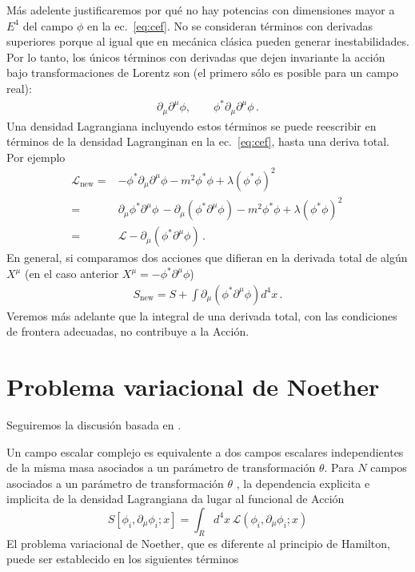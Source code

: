 Más adelente justificaremos por qué no hay potencias con dimensiones mayor a $E^{4}$ del campo $\phi$ en la ec.~\eqref{eq:cef}. No se consideran términos con derivadas superiores porque al igual que en mecánica clásica pueden generar inestabilidades. Por lo tanto, los únicos términos con derivadas que dejen invariante la acción bajo transformaciones de Lorentz son (el primero sólo es posible para un campo real):
\begin{align}
  \partial_{\mu}\partial^{\mu}\phi,\qquad \phi^{*}\partial_{\mu}\partial^{\mu}\phi\,.
\end{align}
Una densidad Lagrangiana incluyendo estos términos se puede reescribir en términos de la densidad Lagranginan en la ec.~\eqref{eq:cef}, hasta una deriva total. Por ejemplo
\begin{align}
  \mathcal{L}_{\text{new}}=&-\phi^{*}\partial_{\mu}\partial^{\mu}\phi-m^2\phi^{*}\phi+\lambda \left(\phi^{*}\phi \right)^2\,\nonumber\\
=&\partial_{\mu}\phi^{*}\partial^{\mu}\phi\,-\partial_{\mu}\left(\phi^{*}\partial^{\mu}\phi\right)-m^2\phi^{*}\phi+\lambda \left(\phi^{*}\phi \right)^2\,\nonumber\\
=&\mathcal{L}-\partial_{\mu}\left(\phi^{*}\partial^{\mu}\phi\right)\,.
\end{align}
En general, si comparamos dos acciones que difieran en la derivada total de algún $X^{\mu}$ (en el caso anterior $X^{\mu}=-\phi^{*}\partial^{\mu}\phi$)
\begin{align}
  S_{\text{new}}=S+\int \partial_{\mu}\left(\phi^{*}\partial^{\mu}\phi\right)d^4x\,.
\end{align}
Veremos más adelante que la integral de una derivada total, con las condiciones de frontera adecuadas, no contribuye a la Acción.





\section{Problema variacional de Noether}

Seguiremos la discusión basada en \cite{Brading:2000hc,Brading:2003nv,Sundermeyer:2014kha}.

Un campo escalar complejo es equivalente a dos campos escalares independientes de la misma masa asociados a un parámetro de transformación $\theta$. Para $N$ campos asociados a un parámetro de transformación $\theta$ , la dependencia explicita e implicita de la densidad Lagrangiana da lugar al funcional de Acción
\begin{equation}
  S[\phi_i,\partial_\mu\phi_i;x]=\int_{R}d^4x\,\mathcal{L}(\phi_i,\partial_\mu\phi_i;x)
\end{equation}
El problema variacional de Noether, que es diferente al principio de Hamilton, puede ser establecido en los siguientes términos

